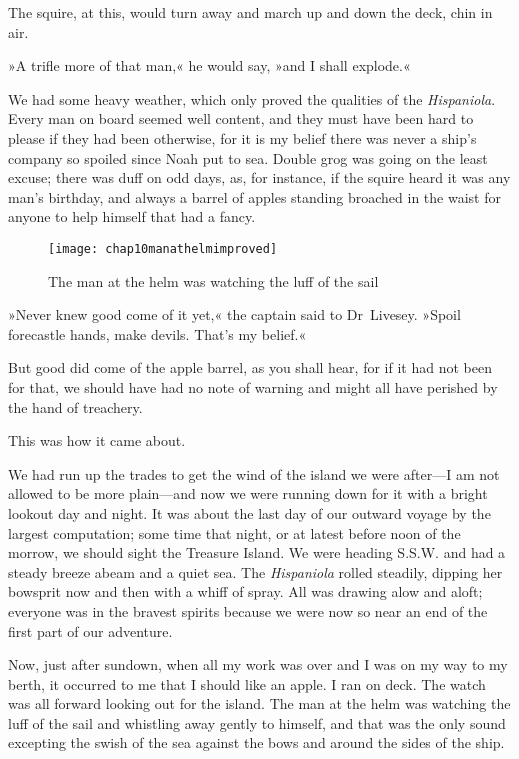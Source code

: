 The squire, at this, would turn away and march up and down the deck, chin in air.

»A trifle more of that man,« he would say, »and I shall explode.«

We had some heavy weather, which only proved the qualities of the \textit{Hispaniola}. Every man on board seemed well content, and they must have been hard to please if they had been otherwise, for it is my belief there was never a ship's company so spoiled since Noah put to sea. Double grog was going on the least excuse; there was duff on odd days, as, for instance, if the squire heard it was any man's birthday, and always a barrel of apples standing broached in the waist for anyone to help himself that had a fancy.

 \begin{figure}[ph]
\centering
\texttt{[image: chap10manathelmimproved]}
\caption{The man at the helm was watching the luff of the sail}
\end{figure}

»Never knew good come of it yet,« the captain said to Dr~Livesey. »Spoil forecastle hands, make devils. That's my belief.«

But good did come of the apple barrel, as you shall hear, for if it had not been for that, we should have had no note of warning and might all have perished by the hand of treachery.

This was how it came about.

We had run up the trades to get the wind of the island we were after—I am not allowed to be more plain—and now we were running down for it with a bright lookout day and night. It was about the last day of our outward voyage by the largest computation; some time that night, or at latest before noon of the morrow, we should sight the Treasure Island. We were heading S.S.W. and had a steady breeze abeam and a quiet sea. The \textit{Hispaniola} rolled steadily, dipping her bowsprit now and then with a whiff of spray. All was drawing alow and aloft; everyone was in the bravest spirits because we were now so near an end of the first part of our adventure.

Now, just after sundown, when all my work was over and I was on my way to my berth, it occurred to me that I should like an apple. I ran on deck. The watch was all forward looking out for the island. The man at the helm was watching the luff of the sail and whistling away gently to himself, and that was the only sound excepting the swish of the sea against the bows and around the sides of the ship.




